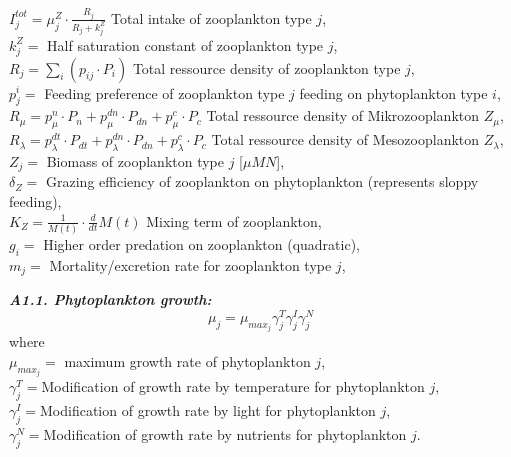 \documentclass[11pt,letterpaper,english]{article}
\begin{document}
\mbox{} \hspace{.5cm} $I^{tot}_j= \mu^{Z}_j⋅\frac{R_{j}}{R_{j} + k^Z_j}$ Total intake of zooplankton type $j$,\\
\mbox{} \hspace{.5cm} $k^Z_j =$ Half saturation constant of zooplankton type $j$,\\
\mbox{} \hspace{.5cm} $R_{j}= \sum_{i} (p_{i j}⋅P_{i})$ Total ressource density of zooplankton type $j$,\\
\mbox{} \hspace{.5cm} $p^i_{j}=$ Feeding preference of zooplankton type $j$ feeding on phytoplankton type $i$,\\
\mbox{} \hspace{.5cm} $R_{\mu}= p^n_{\mu}⋅P_{n} + p^{dn}_{\mu}⋅P_{dn} + p^c_{\mu}⋅P_{c}$ Total ressource density of Mikrozooplankton $Z_{\mu}$,\\
\mbox{} \hspace{.5cm} $R_{\lambda}= p^{dt}_{\lambda}⋅P_{dt} + p^{dn}_{\lambda}⋅P_{dn} + p^c_{\lambda}⋅P_{c}$ Total ressource density of Mesozooplankton $Z_{\lambda}$,\\



\mbox{} \hspace{.5cm} $Z_j=$ Biomass of zooplankton type $j$ [$\mu M N$],\\
\mbox{} \hspace{.5cm} $\delta_{Z}=$ Grazing efficiency of zooplankton on phytoplankton (represents sloppy feeding), \\
\mbox{} \hspace{.5cm} $K_{Z}=\frac{1}{M(t)} \cdot \frac{d}{d t} M(t)$ Mixing term of zooplankton, \\
\mbox{} \hspace{.5cm} $g_{i}=$ Higher order predation on zooplankton (quadratic), \\
\mbox{} \hspace{.5cm} $m_{j}=$ Mortality/excretion rate for zooplankton type $j$,\\





\iffalse %

\vspace{.2cm}

{\it {\bf A1.1. Phytoplankton growth:}}\\
\[
\mu_j = \mu_{max_{j}} \gamma_j^T \gamma_j^I \gamma_j^N
\]
where\\
\mbox{} \hspace{.5cm} $\mu_{max_{j}}=$ maximum growth rate of phytoplankton $j$,\\
\mbox{} \hspace{.5cm} $\gamma_j^T=$Modification of growth rate by
temperature for phytoplankton $j$,\\
\mbox{} \hspace{.5cm} $\gamma_j^I=$Modification of growth rate by light for
phytoplankton $j$,\\
\mbox{} \hspace{.5cm} $\gamma_j^N=$Modification of growth rate by nutrients
for phytoplankton $j$.\\
\end{document}
